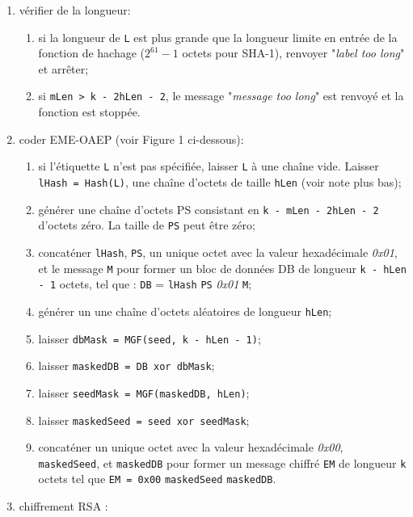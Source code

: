 \begin{enumerate}
\item vérifier de la longueur:
\begin{enumerate}
\item si la longueur de \texttt{L} est plus grande que la longueur limite en entrée de la fonction de hachage ($2^{61} - 1$ octets pour SHA-1), renvoyer "\textit{label too long}" et arrêter;
\item si \texttt{mLen > k - 2hLen - 2}, le message "\textit{message too long}" est renvoyé et la fonction est stoppée.\\
\end{enumerate}
\item coder EME-OAEP (voir Figure 1 ci-dessous):
\begin{enumerate}
\item si l'étiquette \texttt{L} n'est pas spécifiée, laisser \texttt{L} à une chaîne vide. Laisser \texttt{lHash = Hash(L)}, une chaîne d'octets de taille \texttt{hLen} (voir note plus bas);
\item générer une chaîne d'octets PS consistant en \texttt{k - mLen - 2hLen - 2} d'octets zéro. La taille de \texttt{PS} peut être zéro;
\item concaténer \texttt{lHash}, \texttt{PS}, un unique octet avec la valeur hexadécimale \textit{0x01}, et le message \texttt{M} pour former un bloc de données DB de longueur \texttt{k - hLen - 1} octets, tel que : \texttt{DB} = \texttt{lHash} \textbar\textbar \texttt{PS} \textbar\textbar \textit{0x01} \textbar\textbar \texttt{M};
\item générer un une chaîne d'octets aléatoires de longueur \texttt{hLen};
\item laisser \texttt{dbMask = MGF(seed, k - hLen - 1)};
\item laisser \texttt{maskedDB = DB xor dbMask};
\item laisser \texttt{seedMask = MGF(maskedDB, hLen)};
\item laisser \texttt{maskedSeed = seed xor seedMask};
\item concaténer un unique octet avec la valeur hexadécimale \textit{0x00}, \texttt{maskedSeed}, et \texttt{maskedDB} pour former un message chiffré \texttt{EM} de longueur \texttt{k} octets tel que \texttt{EM = 0x00} \textbar\textbar \texttt{maskedSeed} \textbar\textbar \texttt{maskedDB}.\\
\end{enumerate}
\item chiffrement RSA :
\begin{enumerate}

\end{enumerate}
\end{enumerate}
